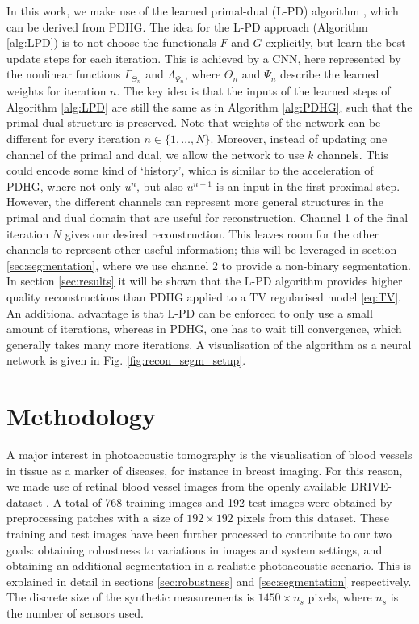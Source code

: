 \documentclass[journal]{IEEEtran}
\newcommand{\hl}[1]{#1}
\begin{document}
In this work, we make use of the learned primal-dual (L-PD) algorithm \cite{Adler2018}, which can be derived from PDHG. The idea for the L-PD approach (Algorithm \ref{alg:LPD}) is to not choose the functionals $F$ and $G$ explicitly, but learn the best update steps for each iteration. This is achieved by a CNN, here represented by the nonlinear functions {$\Gamma_{\Theta_n}$ and $\Lambda_{\Psi_n}$, where $\Theta_n$ and $\Psi_n$} describe the learned weights for iteration $n$. The key idea is that the inputs of the learned steps of Algorithm \ref{alg:LPD} are still the same as in Algorithm \ref{alg:PDHG}, such that the primal-dual structure is preserved. Note that weights of the network can be different for every iteration $n\in\{1,\dots,N\}$. Moreover, instead of updating one channel of the primal and dual, we allow the network to use $k$ channels. This could encode some kind of `history', which is similar to the acceleration of PDHG, where not only $u^n$, but also $u^{n-1}$ is an input in the first proximal step. However, the different channels can represent more general structures in the primal and dual domain that are useful for reconstruction. {Channel 1 of the final iteration $N$ gives our desired reconstruction. This leaves room for the other channels to represent other useful information; this will be leveraged in section \ref{sec:segmentation}, where we use channel 2 to provide a non-binary segmentation.} In section \ref{sec:results} it will be shown that the L-PD algorithm provides higher quality reconstructions than PDHG applied to a TV regularised model \eqref{eq:TV}. An additional advantage is that L-PD can be enforced to only use a small amount of iterations, whereas in PDHG, one has to wait till convergence, which generally takes many more iterations. {A visualisation of the algorithm as a neural network is given in Fig. \ref{fig:recon_segm_setup}.}

\section{Methodology}\label{sec:experiments}
A major interest in photoacoustic tomography is the visualisation of blood vessels in tissue as a marker of diseases, for instance in breast imaging. For this reason, we made use of retinal blood vessel images from the openly available DRIVE-dataset \cite{Staal2004}. A total of 768 training images and 192 test images were obtained by preprocessing patches with a size of $192\times192$ pixels from this dataset. These training and test images have been further processed to contribute to our two goals: obtaining robustness to variations in images and system settings, and obtaining an additional segmentation in a realistic photoacoustic scenario. This is explained in detail in sections \ref{sec:robustness} and \ref{sec:segmentation} respectively. \hl{The discrete size of the synthetic measurements is $1450\times n_s$ pixels, where $n_s$ is the number of sensors used.}
\end{document}
